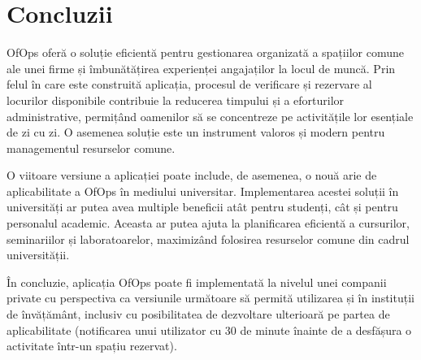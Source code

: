 \chapter{Concluzii}

OfOps oferă o soluție eficientă pentru gestionarea organizată a spațiilor comune ale unei firme și îmbunătățirea experienței angajaților la locul de muncă. Prin felul în care este construită aplicația, procesul de verificare și rezervare al locurilor disponibile contribuie la reducerea timpului și a eforturilor administrative, permițând oamenilor să se concentreze pe activitățile lor esențiale de zi cu zi. O asemenea soluție este un instrument valoros și modern pentru managementul resurselor comune.

O viitoare versiune a aplicației poate include, de asemenea, o nouă arie de aplicabilitate a OfOps în mediului universitar. Implementarea acestei soluții în universități ar putea avea multiple beneficii atât pentru studenți, cât și pentru personalul academic. Aceasta ar putea ajuta la planificarea eficientă a cursurilor, seminariilor și laboratoarelor, maximizând folosirea resurselor comune din cadrul universității.

În concluzie, aplicația OfOps poate fi implementată la nivelul unei companii private cu perspectiva ca versiunile următoare să permită utilizarea și în instituții de învățământ, inclusiv cu posibilitatea de dezvoltare ulterioară pe partea de aplicabilitate (notificarea unui utilizator cu 30 de minute înainte de a desfășura o activitate într-un spațiu rezervat).